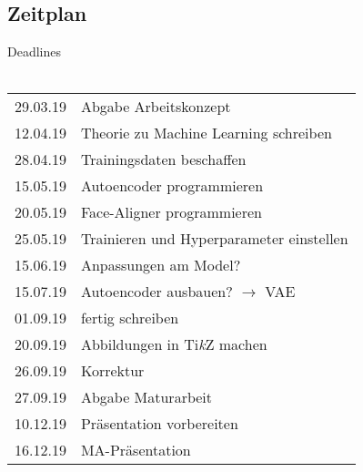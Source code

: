 \documentclass[12pt, a4paper]{article}
\begin{document}
\subsection*{Zeitplan}
Deadlines
\\\\
\begin{tabular}{r | l}
    29.03.19 & Abgabe Arbeitskonzept\\
    12.04.19 & Theorie zu Machine Learning schreiben\\
    28.04.19 & Trainingsdaten beschaffen\\
    15.05.19 & Autoencoder programmieren\\
    20.05.19 & Face-Aligner programmieren\\
    25.05.19 & Trainieren und Hyperparameter einstellen\\
    15.06.19 & Anpassungen am Model?\\
    15.07.19 & Autoencoder ausbauen? $\rightarrow$ VAE\\
    01.09.19 & fertig schreiben\\
    20.09.19 & Abbildungen in Ti\textit kZ machen\\
    26.09.19 & Korrektur\\
    27.09.19 & Abgabe Maturarbeit\\
    10.12.19 & Präsentation vorbereiten\\
    16.12.19 & MA-Präsentation\\

\end{tabular}\\
\end{document}
